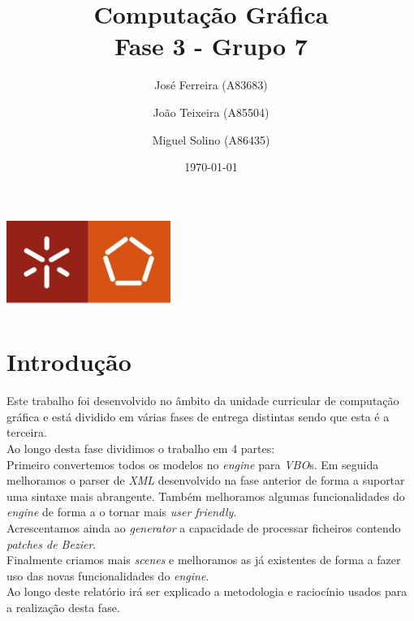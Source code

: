 \documentclass[a4paper]{report}
\begin{document}
\title{Computação Gráfica\\
\large Fase 3 - Grupo 7}
\author{José Ferreira (A83683) \and João Teixeira (A85504) \and Miguel Solino (A86435)}
\date{\today}

\begin{center}
    \begin{minipage}{0.75\linewidth}
        \centering
        \includegraphics[width=0.4\textwidth]{images/eng.jpeg}\par\vspace{1cm}
        \vspace{1.5cm}
        \href{https://www.uminho.pt/PT}
        {\color{black}{\scshape\LARGE Universidade do Minho}} \par
        \vspace{1cm}
        \href{https://www.di.uminho.pt/}
        {\color{black}{\scshape\Large Departamento de Informática}} \par
        \vspace{1.5cm}
        \maketitle
    \end{minipage}
\end{center}

\tableofcontents

\chapter{Introdução}
Este trabalho foi desenvolvido no âmbito da unidade curricular de computação
gráfica e está dividido em várias fases de entrega distintas sendo que esta é a
terceira.\\
Ao longo desta fase dividimos o trabalho em 4 partes:\\
Primeiro convertemos todos os modelos no \textit{engine} para \textit{VBO}s. Em
seguida melhoramos o parser de \textit{XML} desenvolvido na fase anterior de
forma a suportar uma sintaxe mais abrangente. Também melhoramos algumas
funcionalidades do \textit{engine} de forma a o tornar mais \textit{user
friendly}.\\
Acrescentamos ainda ao \textit{generator} a capacidade de processar ficheiros
contendo \textit{patches de Bezier}.\\
Finalmente criamos mais \textit{scenes} e melhoramos as já existentes de forma a
fazer uso das novas funcionalidades do \textit{engine}.\\
Ao longo deste relatório irá ser explicado a metodologia e raciocínio usados
para a realização desta fase.\\
\end{document}
